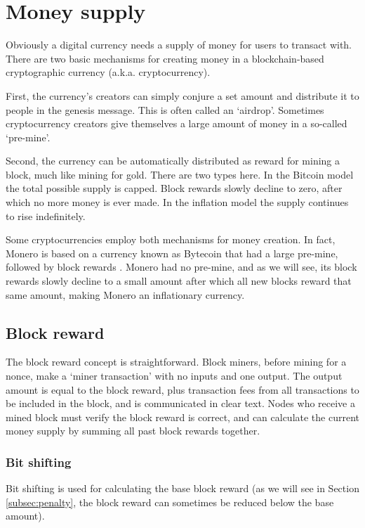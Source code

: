 \section{Money supply}
\label{sec:money-supply}

Obviously a digital currency needs a supply of money for users to transact with. There are two basic mechanisms for creating money in a blockchain-based cryptographic currency (a.k.a. cryptocurrency).

First, the currency's creators can simply conjure a set amount and distribute it to people in the genesis message. This is often called an `airdrop'. Sometimes cryptocurrency creators give themselves a large amount of money in a so-called `pre-mine'.

Second, the currency can be automatically distributed as reward for mining a block, much like mining for gold. There are two types here. In the Bitcoin model the total possible supply is capped. Block rewards slowly decline to zero, after which no more money is ever made. In the inflation model the supply continues to rise indefinitely. 

Some cryptocurrencies employ both mechanisms for money creation. In fact, Monero is based on a currency known as Bytecoin that had a large pre-mine, followed by block rewards \cite{monero-history}. Monero had no pre-mine, and as we will see, its block rewards slowly decline to a small amount after which all new blocks reward that same amount, making Monero an inflationary currency.


\subsection{Block reward}
\label{subsec:block-reward} %

The block reward concept is straightforward. Block miners, before mining for a nonce, make a `miner transaction' with no inputs and one output. The output amount is equal to the block reward, plus transaction fees from all transactions to be included in the block, and is communicated in clear text. Nodes who receive a mined block must verify the block reward is correct, and can calculate the current money supply by summing all past block rewards together.


\subsubsection*{Bit shifting}

Bit shifting is used for calculating the base block reward (as we will see in Section \ref{subsec:penalty}, the block reward can sometimes be reduced below the base amount). 

